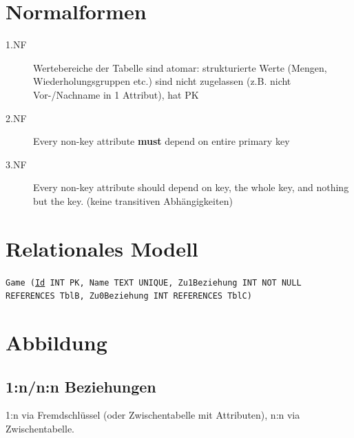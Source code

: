
\newcommand{\TITLE}{Datenbanksysteme 1}
\newcommand{\AUTHOR}{Florian Bruhin, Mona Panchaud}
\newcommand{\INSTITUTE}{Ostschweizer Fachhochschule}


\footnotesize
\begin{multicols*}{3}

\setlength{\premulticols}{1pt}
\setlength{\postmulticols}{1pt}
\setlength{\multicolsep}{1pt}
\setlength{\columnsep}{2pt}

\section{Normalformen}
\begin{description}
    \item[1.NF] Wertebereiche der Tabelle sind atomar: strukturierte Werte (Mengen, Wiederholungsgruppen etc.) sind nicht zugelassen (z.B. nicht Vor-/Nachname in 1 Attribut), hat PK
    \item[2.NF] Every non-key attribute \textbf{must} depend on entire primary key
    \item[3.NF] Every non-key attribute should depend on key, the whole key, and nothing but the key. (keine transitiven Abhängigkeiten)
\end{description}

\section{Relationales Modell}

\texttt{Game (\underline{Id} INT PK, Name TEXT UNIQUE, Zu1Beziehung INT NOT NULL REFERENCES TblB, Zu0Beziehung INT REFERENCES TblC)}

\section{Abbildung}
\subsection{1:n/n:n Beziehungen}
1:n via Fremdschlüssel (oder Zwischentabelle mit Attributen), n:n via
Zwischentabelle.

\end{multicols*}
